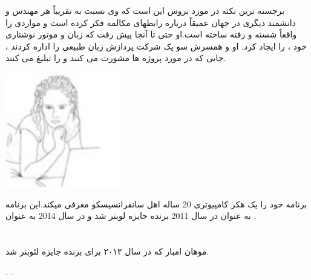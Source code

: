 \documentclass[18pt,a4paper]{report}
\begin{document}
 برجسته ترین نکته در مورد بروس این است که وی نسبت به تقریباً هر مهندس و دانشمند دیگری در جهان عمیقاً درباره رابطهای مکالمه فکر کرده است و مواردی را واقعاً شسته و رفته ساخته است.او حتی تا آنجا پیش رفت که زبان و موتور نوشتاری خود ،  را ایجاد کرد. او و همسرش سو یک شرکت پردازش زبان طبیعی  را اداره کردند ، جایی که در مورد پروژه ها مشورت می کنند و  را تبلیغ می کنند. 

 	\begin{center}
 		\includegraphics[width=5cm, height=5cm]{imgs/chatbot_rosette_d____10513.jpg}
 		\label{Rose image}

 	\end{center}

 
 برنامه  خود را یک هکر کامپیوتری 20 ساله اهل سانفرانسیسکو معرفی میکند.این برنامه به عنوان   در سال 2011 برنده جایزه لوبنر شد و در سال 2014 به عنوان  .
 
  
 \section{}
 موهان امبار که در سال ۲۰۱۲ برای  برنده جایزه لئوبنر شد.

\begin{thebibliography}{9}
	\latin
	.
	.
\end{thebibliography}
 	
 
 	
\end{document}
